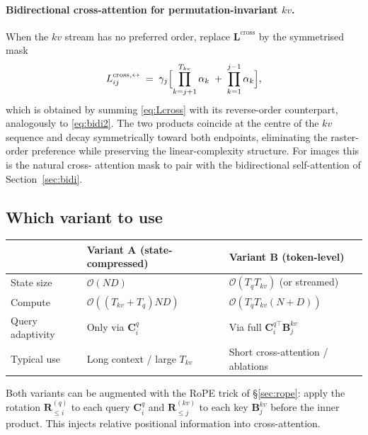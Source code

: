 \documentclass[11pt,a4paper]{article}
\begin{document}
\paragraph{Bidirectional cross-attention for permutation-invariant $kv$.}
When the $kv$ stream has no preferred order, replace
$\bm{L}^{\text{cross}}$ by the symmetrised mask
\begin{equation}\label{eq:Lcross-bi}
  L^{\text{cross},\leftrightarrow}_{ij}
     \;=\; \gamma_j\Bigl[\prod_{k=j+1}^{T_{kv}}\alpha_k
                         \;+\; \prod_{k=1}^{j-1}\alpha_k\Bigr],
\end{equation}
which is obtained by summing \eqref{eq:Lcross} with its reverse-order
counterpart, analogously to \eqref{eq:bidi2}. The two products coincide
at the centre of the $kv$ sequence and decay symmetrically toward both
endpoints, eliminating the raster-order preference while preserving the
linear-complexity structure. For images this is the natural cross-
attention mask to pair with the bidirectional self-attention of
Section~\ref{sec:bidi}.

\subsection{Which variant to use}

\begin{center}
\begin{tabular}{|l|l|l|}
\hline
 & \textbf{Variant A} (state-compressed) & \textbf{Variant B} (token-level)\\ \hline
State size        & $\mathcal{O}(ND)$             & $\mathcal{O}(T_q T_{kv})$ (or streamed) \\ \hline
Compute          & $\mathcal{O}((T_{kv}+T_q)ND)$ & $\mathcal{O}(T_q T_{kv}(N+D))$ \\ \hline
Query adaptivity & Only via $\bm{C}_i^q$         & Via full $\bm{C}_i^{q\top}\bm{B}_j^{kv}$ \\ \hline
Typical use      & Long context / large $T_{kv}$ & Short cross-attention / ablations \\ \hline
\end{tabular}
\end{center}

Both variants can be augmented with the RoPE trick of
\S\ref{sec:rope}: apply the rotation $\bm{R}_{\le i}^{(q)}$ to each
query $\bm{C}_i^q$ and $\bm{R}_{\le j}^{(kv)}$ to each key
$\bm{B}_j^{kv}$ before the inner product. This injects relative
positional information into cross-attention.
\end{document}
